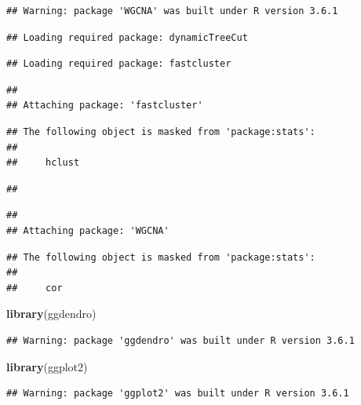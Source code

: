 \documentclass[]{article}
\newenvironment{Shaded}{\begin{snugshade}}{\end{snugshade}}
\newcommand{\KeywordTok}[1]{\textcolor[rgb]{0.13,0.29,0.53}{\textbf{#1}}}
\newcommand{\NormalTok}[1]{#1}
\begin{document}
\begin{verbatim}
## Warning: package 'WGCNA' was built under R version 3.6.1
\end{verbatim}

\begin{verbatim}
## Loading required package: dynamicTreeCut
\end{verbatim}

\begin{verbatim}
## Loading required package: fastcluster
\end{verbatim}

\begin{verbatim}
## 
## Attaching package: 'fastcluster'
\end{verbatim}

\begin{verbatim}
## The following object is masked from 'package:stats':
## 
##     hclust
\end{verbatim}

\begin{verbatim}
## 
\end{verbatim}

\begin{verbatim}
## 
## Attaching package: 'WGCNA'
\end{verbatim}

\begin{verbatim}
## The following object is masked from 'package:stats':
## 
##     cor
\end{verbatim}

\begin{Shaded}
\begin{Highlighting}[]
\KeywordTok{library}\NormalTok{(ggdendro)}
\end{Highlighting}
\end{Shaded}

\begin{verbatim}
## Warning: package 'ggdendro' was built under R version 3.6.1
\end{verbatim}

\begin{Shaded}
\begin{Highlighting}[]
\KeywordTok{library}\NormalTok{(ggplot2)}
\end{Highlighting}
\end{Shaded}

\begin{verbatim}
## Warning: package 'ggplot2' was built under R version 3.6.1
\end{verbatim}
\end{document}
